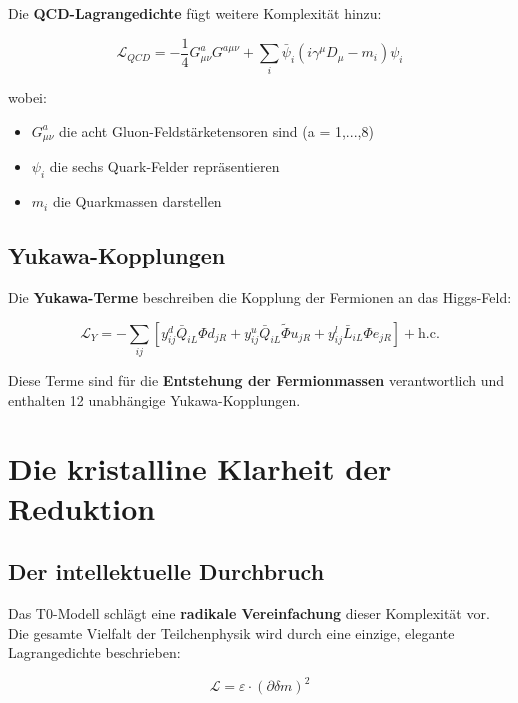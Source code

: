 \documentclass[12pt,a4paper]{report}
\begin{document}
	Die \textbf{QCD-Lagrangedichte} fügt weitere Komplexität hinzu:
	
	\begin{equation}
		\mathcal{L}_{QCD} = -\frac{1}{4} G_{\mu\nu}^a G^{a\mu\nu} + \sum_i \bar{\psi}_i(i\gamma^\mu D_\mu - m_i)\psi_i
	\end{equation}
	
	wobei:
	\begin{itemize}
		\item $G_{\mu\nu}^a$ die acht Gluon-Feldstärketensoren sind (a = 1,...,8)
		\item $\psi_i$ die sechs Quark-Felder repräsentieren
		\item $m_i$ die Quarkmassen darstellen
	\end{itemize}
	
	\subsection{Yukawa-Kopplungen}
	
	Die \textbf{Yukawa-Terme} beschreiben die Kopplung der Fermionen an das Higgs-Feld:
	
	\begin{equation}
		\mathcal{L}_Y = -\sum_{ij} [y_{ij}^d \bar{Q}_{iL} \Phi d_{jR} + y_{ij}^u \bar{Q}_{iL} \tilde{\Phi} u_{jR} + y_{ij}^l \bar{L}_{iL} \Phi e_{jR}] + \text{h.c.}
	\end{equation}
	
	Diese Terme sind für die \textbf{Entstehung der Fermionmassen} verantwortlich und enthalten 12 unabhängige Yukawa-Kopplungen.
	
	\section{Die kristalline Klarheit der Reduktion}
	
	\subsection{Der intellektuelle Durchbruch}
	
	Das T0-Modell schlägt eine \textbf{radikale Vereinfachung} dieser Komplexität vor. Die gesamte Vielfalt der Teilchenphysik wird durch eine einzige, elegante Lagrangedichte beschrieben:
	
	\begin{equation}
		\mathcal{L} = \varepsilon \cdot (\partial\delta m)^2
	\end{equation}
	
\end{document}
